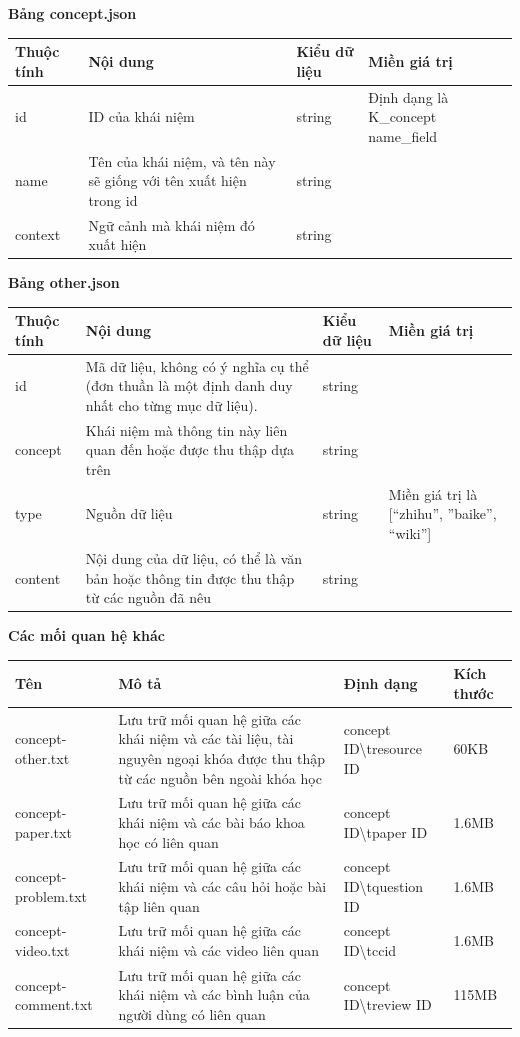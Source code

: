 %
\textbf{Bảng concept.json}
\begin{center}
\begin{tabular}{|| m{5em}  m{8em}  m{6em}  m{11em}||} 
 \hline
 Thuộc tính & Nội dung & Kiểu dữ liệu & Miền giá trị \\ [0.5ex] 
 \hline\hline
id &ID của khái niệm & string &Định dạng là K\_{concept name}\_{field}\\
 \hline
name & Tên của khái niệm, và tên này sẽ giống với tên xuất hiện trong id & string & \\
 \hline
context &Ngữ cảnh mà khái niệm đó xuất hiện  &string &\\ [1ex] 
 \hline
\end{tabular}
\end{center}
%
\textbf{Bảng other.json}
\begin{center}
\begin{tabular}{|| m{5em}  m{8em}  m{6em}  m{11em}||} 
 \hline
 Thuộc tính & Nội dung & Kiểu dữ liệu & Miền giá trị \\ [0.5ex] 
 \hline\hline
id &Mã dữ liệu, không có ý nghĩa cụ thể (đơn thuần là một định danh duy nhất cho từng mục dữ liệu). & string &\\
 \hline
concept &Khái niệm mà thông tin này liên quan đến hoặc được thu thập dựa trên & string &\\
 \hline
type & Nguồn dữ liệu & string & Miền giá trị là [“zhihu”, ”baike”, “wiki”]\\
 \hline
content &Nội dung của dữ liệu, có thể là văn bản hoặc thông tin được thu thập từ các nguồn đã nêu  &string &\\ [1ex] 
 \hline
\end{tabular}
\end{center}
%
\textbf{Các mối quan hệ khác}
\begin{center}
\begin{tabular}{|| m{5em}  m{10em}  m{11em}  m{5em}||} 
 \hline
 Tên & Mô tả & Định dạng & Kích thước \\ [0.5ex] 
 \hline\hline
concept-other.txt & Lưu trữ mối quan hệ giữa các khái niệm và các tài liệu, tài nguyên ngoại khóa được thu thập từ các nguồn bên ngoài khóa học & {concept ID}\textbackslash t{resource ID} &60KB \\
 \hline
 concept-paper.txt &Lưu trữ mối quan hệ giữa các khái niệm và các bài báo khoa học có liên quan & {concept ID}\textbackslash t{paper ID} & 1.6MB \\ \hline
 concept-problem.txt & Lưu trữ mối quan hệ giữa các khái niệm và các câu hỏi hoặc bài tập liên quan & {concept ID}\textbackslash t{question ID} & 1.6MB \\ \hline
 concept-video.txt& Lưu trữ mối quan hệ giữa các khái niệm và các video liên quan  & {concept ID}\textbackslash t{ccid} & 1.6MB \\ \hline
 concept-comment.txt& Lưu trữ mối quan hệ giữa các khái niệm và các bình luận của người dùng có liên quan & {concept ID}\textbackslash t{review ID} &115MB  \\ [1ex] 
 \hline
\end{tabular}
\end{center}
